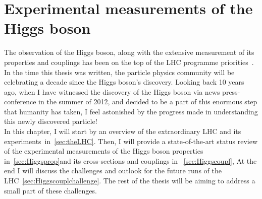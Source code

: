 \chapter{Experimental measurements of the Higgs boson }\label{chap:HiggsConstr}
The observation of the Higgs boson, along with the extensive measurement of its properties and couplings has been on the top of the LHC programme priorities~\cite{ellis2000physics}. In the time this thesis was written, the particle physics community will be celebrating a decade since the Higgs boson's discovery. Looking back 10 years ago, when I have witnessed the discovery of the Higgs boson via news press-conference in the summer of 2012, and decided to be a part of this enormous step that humanity has taken, 
I feel astonished by the progress made in understanding this newly discovered particle!  \\ In this chapter, I will start by an overview of the extraordinary LHC and its experiments~in~\autoref{sec:theLHC}. Then, I will provide a state-of-the-art status review of the experimental measurements of the Higgs boson properties in~\autoref{sec:Higgsprop}and its cross-sections  and couplings in ~\autoref{sec:Higgscoupl}, At the end I will discuss the challenges and outlook for the future runs of the LHC~\autoref{sec:Higgscouplchallenge}. The rest of the thesis will be aiming to address a small part of these challenges.
